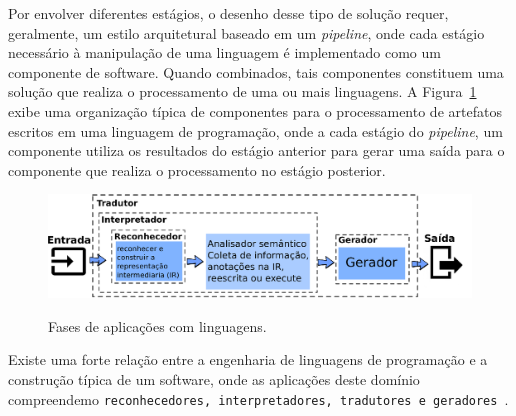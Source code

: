 Por envolver diferentes est\'{a}gios, o desenho desse tipo de solu\c c\~{a}o requer, geralmente, 
um estilo arquitetural baseado em um \emph{pipeline},  onde cada est\'{a}gio necess\'{a}rio \`{a}  
 manipulaç\~{a}o de uma linguagem \'{e} implementado como um componente de software. Quando combinados, 
tais componentes constituem uma solu\c c\~{a}o que realiza o processamento 
de uma ou mais linguagens. A Figura~\ref{fig:stagesLanguageApp} exibe uma organiza\c c\~{a}o 
t\'{i}pica de componentes para o processamento de artefatos escritos em uma linguagem de 
programa\c c\~{a}o, onde a cada est\'{a}gio do \emph{pipeline}, um componente 
utiliza os resultados do est\'{a}gio anterior para gerar uma sa\'{i}da para o componente 
que realiza o processamento no est\'{a}gio posterior.  

\begin{figure}[h]
  \center
  \includegraphics[scale=0.9]{Imagens/stagesLanguageApp}
  \label{fig:stagesLanguageApp}
  \caption{Fases de aplicaç\~{o}es com linguagens.}
\end{figure}

Existe uma forte rela\c c\~{a}o entre a engenharia de linguagens de programaç\~{a}o 
e a constru\c c\~{a}o t\'{i}pica de um software, onde as aplica\c c\~{o}es deste 
dom\'{i}nio compreendemo \texttt{reconhecedores, interpretadores, tradutores e geradores}~\cite{Parr:2009:LIP:1823613}. 



	

